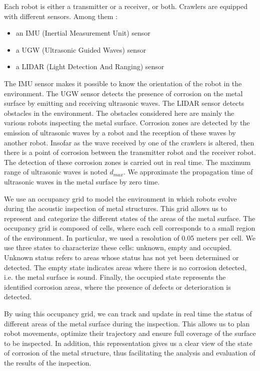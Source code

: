 Each robot is either a transmitter or a receiver, or both.
Crawlers are equipped with different sensors.
Among them :
\begin{itemize}
	\item an IMU (Inertial Measurement Unit) sensor
	\item a UGW (Ultrasonic Guided Waves) sensor
	\item a LIDAR (Light Detection And Ranging) sensor
\end{itemize}
The IMU sensor makes it possible to know the orientation of the robot in the environment.
The UGW sensor detects the presence of corrosion on the metal surface by emitting and receiving ultrasonic waves.
The LIDAR sensor detects obstacles in the environment.
The obstacles considered here are mainly the various robots inspecting the metal surface.
Corrosion zones are detected by the emission of ultrasonic waves by a robot and the reception of these waves by another robot.
Insofar as the wave received by one of the crawlers is altered, then there is a point of corrosion between the transmitter robot and the receiver robot.
The detection of these corrosion zones is carried out in real time.
The maximum range of ultrasonic waves is noted $d_{max}$.
We approximate the propagation time of ultrasonic waves in the metal surface by zero time.

We use an occupancy grid to model the environment in which robots evolve during the acoustic inspection of metal structures.
This grid allows us to represent and categorize the different states of the areas of the metal surface.
The occupancy grid is composed of cells, where each cell corresponds to a small region of the environment.
In particular, we used a resolution of 0.05 meters per cell.
We use three states to characterize these cells: unknown, empty and occupied.
Unknown status refers to areas whose status has not yet been determined or detected.
The empty state indicates areas where there is no corrosion detected, i.e. the metal surface is sound.
Finally, the occupied state represents the identified corrosion areas, where the presence of defects or deterioration is detected.

By using this occupancy grid, we can track and update in real time the status of different areas of the metal surface during the inspection.
This allows us to plan robot movements, optimize their trajectory and ensure full coverage of the surface to be inspected.
In addition, this representation gives us a clear view of the state of corrosion of the metal structure, thus facilitating the analysis and evaluation of the results of the inspection.

